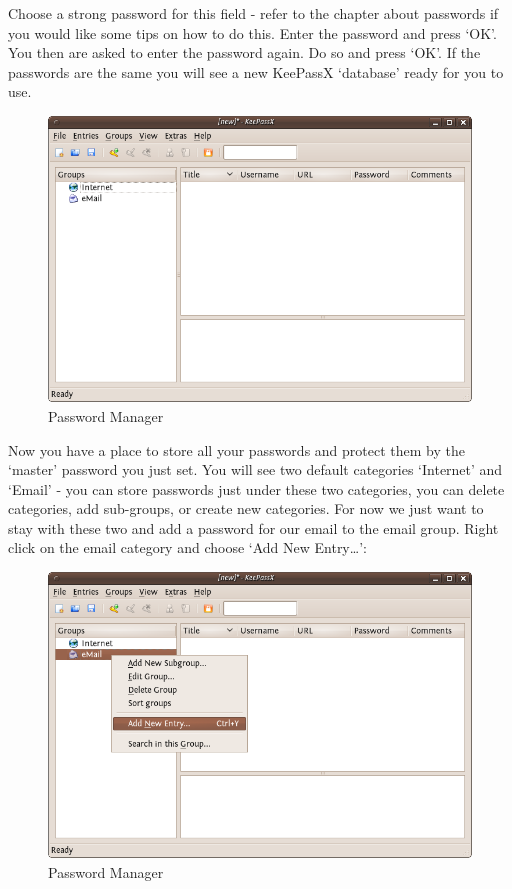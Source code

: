 Choose a strong password for this field - refer to the chapter about
passwords if you would like some tips on how to do this. Enter the
password and press `OK'. You then are asked to enter the password again.
Do so and press `OK'. If the passwords are the same you will see a new
KeePassX `database' ready for you to use.

\begin{figure}[htbp]
\centering
\includegraphics{mng_2.png}
\caption{Password Manager}
\end{figure}

Now you have a place to store all your passwords and protect them by the
`master' password you just set. You will see two default categories
`Internet' and `Email' - you can store passwords just under these two
categories, you can delete categories, add sub-groups, or create new
categories. For now we just want to stay with these two and add a
password for our email to the email group. Right click on the email
category and choose `Add New Entry\ldots{}':

\begin{figure}[htbp]
\centering
\includegraphics{mng_3.png}
\caption{Password Manager}
\end{figure}

